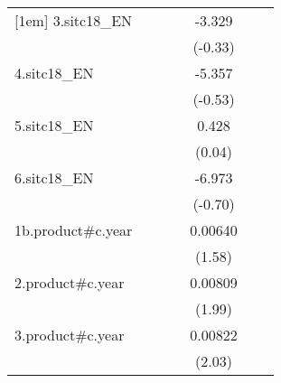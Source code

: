 {\begin{tabular}{l*{6}{c}}
[1em]
3.sitc18\_EN         &                     &                     &                     &      -3.329         &                     &                     \\
                    &                     &                     &                     &     (-0.33)         &                     &                     \\
[1em]
4.sitc18\_EN         &                     &                     &                     &      -5.357         &                     &                     \\
                    &                     &                     &                     &     (-0.53)         &                     &                     \\
[1em]
5.sitc18\_EN         &                     &                     &                     &       0.428         &                     &                     \\
                    &                     &                     &                     &      (0.04)         &                     &                     \\
[1em]
6.sitc18\_EN         &                     &                     &                     &      -6.973         &                     &                     \\
                    &                     &                     &                     &     (-0.70)         &                     &                     \\
[1em]
1b.product#c.year   &                     &                     &                     &     0.00640         &                     &                     \\
                    &                     &                     &                     &      (1.58)         &                     &                     \\
[1em]
2.product#c.year    &                     &                     &                     &     0.00809\sym{*}  &                     &                     \\
                    &                     &                     &                     &      (1.99)         &                     &                     \\
[1em]
3.product#c.year    &                     &                     &                     &     0.00822\sym{*}  &                     &                     \\
                    &                     &                     &                     &      (2.03)         &                     &                     \\

\end{tabular}}
